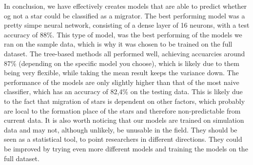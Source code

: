 In conclusion, we have effectively creates models that are able to predict whether og not a star could be classified as a migrator. The best performing model was a pretty simpe neural network, consisting of a dense layer of 16 neurons, with a test accuracy of 88\%. This type of model, was the best performing of the models we ran on the sample data, which is why it was chosen to be trained on the full dataset.
The tree-based methods all performed well, achieving accuarcies around 87\% (depending on the specific model you choose), which is likely due to them being very flexible, while taking the mean result keeps the variance down. The performance of the models are only slightly higher than that of the most naive classifier, which has an accuracy of 82,4\% on the testing data. This is likely due to the fact that migration of stars is dependent on other factors, which probably are local to the formation place of the stars and therefore non-predictable from current data. It is also worth noticing that our models are trained on simulation data and may not, although unlikely, be unusable in the field. They should be seen as a statistical tool, to point researchers in different directions. They could be improved by trying even more different models and training the models on the full dataset.
